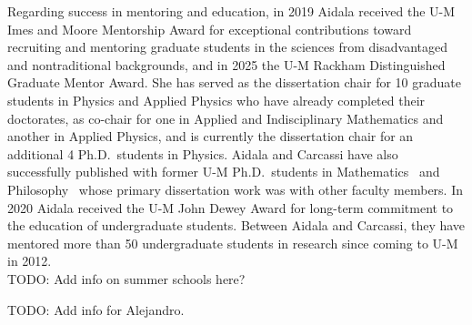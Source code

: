 Regarding success in mentoring and education, in 2019 Aidala received the U-M Imes and Moore Mentorship Award for exceptional contributions toward recruiting and mentoring graduate students in the sciences from disadvantaged and nontraditional backgrounds, and in 2025 the U-M Rackham Distinguished Graduate Mentor Award.  She has served as the dissertation chair for 10 graduate students in Physics and Applied Physics who have already completed their doctorates, as co-chair for one in Applied and Indisciplinary Mathematics and another in Applied Physics, and is currently the dissertation chair for an additional 4 Ph.D.~students in Physics.  Aidala and Carcassi have also successfully published with former U-M Ph.D.~students in Mathematics~\cite{aop-spacetimeStruct} and Philosophy~\cite{aop-HamPriv} whose primary dissertation work was with other faculty members.  In 2020 Aidala received the U-M John Dewey Award for long-term commitment to the education of undergraduate students.  Between Aidala and Carcassi, they have mentored more than 50 undergraduate students in research since coming to U-M in 2012.  \\

TODO: Add info on summer schools here? 

TODO: Add info for Alejandro.

